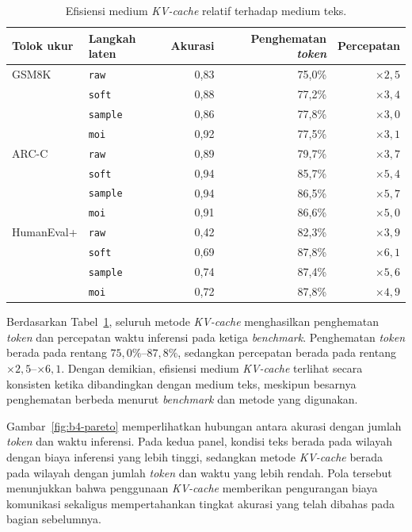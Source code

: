 \begin{table}[H]
    \centering
    \caption{Efisiensi medium \textit{KV-cache} relatif terhadap medium teks.}
    \label{tab:efisiensi-kv-teks}
    \small
    \begin{tabular}{llrrr}
        \hline
        Tolok ukur & Langkah laten & Akurasi &
        Penghematan \textit{token} & Percepatan \\
        \hline
        GSM8K & \texttt{raw}    & 0,83 & 75,0\% & $\times 2,5$ \\
              & \texttt{soft}   & 0,88 & 77,2\% & $\times 3,4$ \\
              & \texttt{sample} & 0,86 & 77,8\% & $\times 3,0$ \\
              & \texttt{moi}    & 0,92 & 77,5\% & $\times 3,1$ \\
        \hline
        ARC-C & \texttt{raw}    & 0,89 & 79,7\% & $\times 3,7$ \\
              & \texttt{soft}   & 0,94 & 85,7\% & $\times 5,4$ \\
              & \texttt{sample} & 0,94 & 86,5\% & $\times 5,7$ \\
              & \texttt{moi}    & 0,91 & 86,6\% & $\times 5,0$ \\
        \hline
        HumanEval+ & \texttt{raw}    & 0,42 & 82,3\% & $\times 3,9$ \\
                   & \texttt{soft}   & 0,69 & 87,8\% & $\times 6,1$ \\
                   & \texttt{sample} & 0,74 & 87,4\% & $\times 5,6$ \\
                   & \texttt{moi}    & 0,72 & 87,8\% & $\times 4,9$ \\
        \hline
    \end{tabular}
\end{table}

Berdasarkan Tabel~\ref{tab:efisiensi-kv-teks}, seluruh metode
\textit{KV-cache} menghasilkan penghematan \textit{token} dan percepatan
waktu inferensi pada ketiga \textit{benchmark}. Penghematan \textit{token}
berada pada rentang $75{,}0\%$--$87{,}8\%$, sedangkan percepatan berada pada
rentang $\times 2{,}5$--$\times 6{,}1$. Dengan demikian, efisiensi medium
\textit{KV-cache} terlihat secara konsisten ketika dibandingkan dengan medium
teks, meskipun besarnya penghematan berbeda menurut \textit{benchmark} dan
metode yang digunakan.

Gambar~\ref{fig:b4-pareto} memperlihatkan hubungan antara akurasi dengan
jumlah \textit{token} dan waktu inferensi. Pada kedua panel, kondisi teks
berada pada wilayah dengan biaya inferensi yang lebih tinggi, sedangkan
metode \textit{KV-cache} berada pada wilayah dengan jumlah \textit{token}
dan waktu yang lebih rendah. Pola tersebut menunjukkan bahwa penggunaan
\textit{KV-cache} memberikan pengurangan biaya komunikasi sekaligus
mempertahankan tingkat akurasi yang telah dibahas pada bagian sebelumnya.

